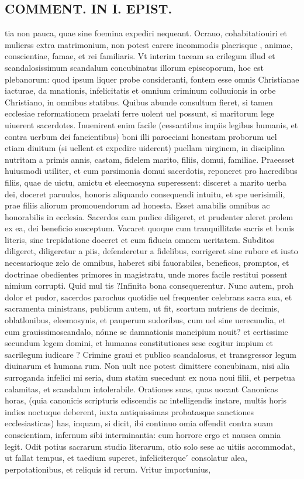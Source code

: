 \documentclass{article}
\begin{document}
\begin{pages}
\section*{COMMENT. IN I. EPIST. }
\marginpar{[ p.492 ]}\pstart tia non pauca, quae sine foemina expediri nequeant. Ocrauo, cohabitatiouiri et mulierss extra matrimonium, non potest carere incommodis plaerisque , animae, conscientiae, famae, et rei familiaris. Vt interim taceam sa crilegum illud et scandalosissimum scandalum concubinatus illorum episcoporum, hoc est plebanorum: quod ipsum liquer probe consideranti, fontem esse omnis Christianae iacturae, da mnationis, infelicitatis et omnium criminum colluuionis in orbe Christiano, in omnibus statibus. Quibus abunde consultum fieret, si tamen ecclesiae reformationem praelati ferre uolent uel possunt, si maritorum lege uiuerent sacerdotes. Inuenirent enim facile (cessantibus impiis legibus humanis, et contra uerbum dei fancientibus) boni illi paroeciani honestam proborum uel etiam diuitum (si uellent et expedire uiderent) puellam uirginem, in disciplina nutritam a primis annis, castam, fidelem marito, filiis, domui, familiae. Praeesset huiusmodi utiliter, et cum parsimonia domui sacerdotis, reponeret pro haeredibus filiis, quae de uictu, amictu et eleemosyna superessent: disceret a marito uerba dei, doceret paruulos, honoris aliquando consequendi intuitu, et spe uerisimili, prae filiis aliorum promouendorum ad honesta. Esset amabilis omnibus ac honorabilis in ecclesia. Sacerdos eam pudice diligeret, et prudenter aleret prolem ex ea, dei beneficio susceptum. Vacaret quoque cum tranquillitate sacris et bonis literis, sine trepidatione doceret et cum fiducia omnem ueritatem. Subditos diligeret, diligeretur a piis, defenderetur a fidelibus, corrigeret sine rubore et iusto necessarioque zelo de omnibus, haberet sibi fauorabiles, beneficos, promptos, et doctrinae obedientes primores in magistratu, unde mores facile restitui possent nimium corrupti. Quid mul tis ?Infinita bona consequerentur. Nunc autem, proh dolor et pudor, sacerdos parochus quotidie uel frequenter celebrans sacra sua, et sacramenta ministrans, publicum autem, ut fit, scortum nutriens de decimis, oblatlonibus, eleemosynis, et pauperum sudoribus, cum uel sine uerecundia, et cum grauissimoscandalo, nónne se damnationis mancipium nouit? et certissime secundum legem domini, et humanas constitutiones sese cogitur impium et sacrilegum iudicare ? Crimine graui et publico scandalosus, et transgressor legum diuinarum et humana rum. Non uult nec potest dimittere concubinam, nisi alia surroganda infelici mi seria, dum statim suecedunt ex noua noui filii, et perpetua calamitas, et scandalum intolerabile. Orationes suas, quas uocant Canonicas horas, (quia canonicis scripturis ediscendis ac intelligendis instare, multis horis indies noctuque deberent, iuxta antiquissimas probatasque sanctiones ecclesiasticas) has, inquam, si dicit, ibi continuo omia offendit contra suam conscientiam, infernum sibi interminantia: cum horrore ergo et nausea omnia legit. Odit potius sacrarum studia literarum, otio solo sese ac uitiis accommodat, ut fallat tempus, et taedium superet, infeliciterque ́ consolatur alea, perpotationibus, et reliquis id rerum. Vritur importunius, 
\end{pages}
\end{document}
